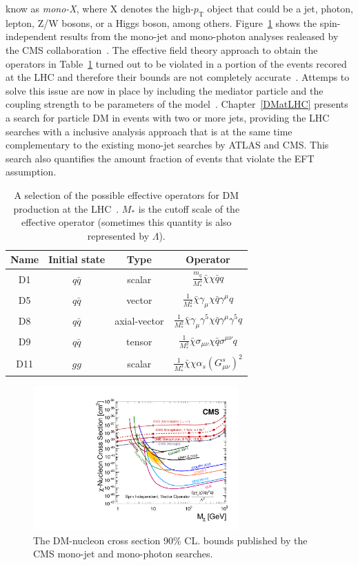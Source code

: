 know as \textit{mono-X}, where X denotes the high-$p_{\mathrm{T}}$
object that could be a jet, photon, lepton, Z/W bosons, or a Higgs
boson, among others. Figure~\ref{fig:CMSlimits} shows the
spin-independent results from the mono-jet and mono-photon analyses
realeased by the CMS
collaboration~\cite{Aad:2011xw,Chatrchyan:2012me,Khachatryan:2014rwa,Aad:2014tda}. The
effective field theory approach to obtain the operators in
Table~\ref{tab:EFT} turned out to be violated in a portion
of the events recored at the LHC and therefore their bounds are not
completely accurate~\cite{Riotto1,Riotto2,Riotto3}. Attemps to solve this issue are now in
place by including the mediator particle and the coupling strength to
be parameters of the model~\cite{DMFORUM}. Chapter~\ref{DMatLHC} presents a
search for particle DM in events with two or more jets, providing the
LHC searches with a inclusive analysis approach that is at the same
time complementary to the existing mono-jet searches by ATLAS and
CMS. This search also quantifies the amount fraction of events that
violate the EFT assumption.

\begin{table}[htb]
\centering
\large
\begin{tabular}{cccc}
  \hline
  \hline
  Name &  Initial state &  Type & Operator\\
  \hline                                                        
  D1 & $q\bar{q}$ &  scalar & $\frac{m_{q}}{M^{3}_{*}}\bar{\chi}\chi\bar{q}q$\\
  D5 & $q\bar{q}$ & vector & $\frac{1}{M^{2}_{*}}\bar{\chi}\gamma_{\mu}\chi\bar{q}\gamma^{\mu} q$\\
  D8 & $q\bar{q}$ &  axial-vector & $\frac{1}{M^{2}_{*}}\bar{\chi}\gamma_{\mu}\gamma^{5}\chi\bar{q}\gamma^{\mu}\gamma^{5} q$\\
  D9 & $q\bar{q}$ &  tensor & $\frac{1}{M^{2}_{*}}\bar{\chi}\sigma_{\mu\nu}\chi\bar{q}\sigma^{\mu\nu} q$\\
  D11 & $gg$ &  scalar & $\frac{1}{M^{3}_{*}}\bar{\chi}\chi\alpha_{s}(G^{s}_{\mu\nu})^2$\\
  \hline
  \hline
\end{tabular}
  \caption{\label{tab:EFT}A selection of the possible effective operators for DM production at
    the LHC~\cite{EFTColliders}. $M_{*}$ is the cutoff scale of
    the effective operator (sometimes this quantity is also
    represented by $\Lambda$).}
\end{table}

\begin{figure}
 \centering
\includegraphics[width=0.7\textwidth]{IntroFigures/dm_limit.pdf}
\caption{The DM-nucleon cross section 90\% CL. bounds published by
  the CMS mono-jet
  and mono-photon searches.\label{fig:CMSlimits}}
\end{figure}